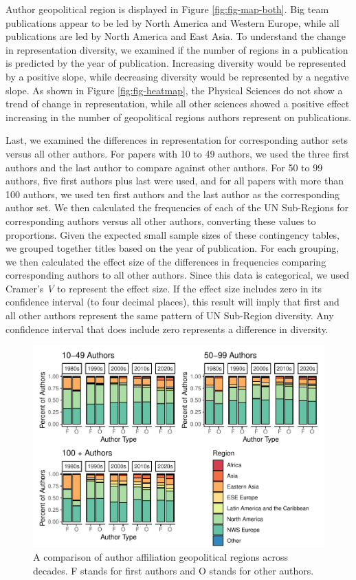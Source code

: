 \documentclass[
  man,floatsintext]{apa6}
\begin{document}
Author geopolitical region is displayed in Figure
\ref{fig:fig-map-both}. Big team publications appear to be led by North
America and Western Europe, while all publications are led by North
America and East Asia. To understand the change in representation
diversity, we examined if the number of regions in a publication is
predicted by the year of publication. Increasing diversity would be
represented by a positive slope, while decreasing diversity would be
represented by a negative slope. As shown in Figure
\ref{fig:fig-heatmap}, the Physical Sciences do not show a trend of
change in representation, while all other sciences showed a positive
effect increasing in the number of geopolitical regions authors
represent on publications.

Last, we examined the differences in representation for corresponding
author sets versus all other authors. For papers with 10 to 49 authors,
we used the three first authors and the last author to compare against
other authors. For 50 to 99 authors, five first authors plus last were
used, and for all papers with more than 100 authors, we used ten first
authors and the last author as the corresponding author set. We then
calculated the frequencies of each of the UN Sub-Regions for
corresponding authors versus all other authors, converting these values
to proportions. Given the expected small sample sizes of these
contingency tables, we grouped together titles based on the year of
publication. For each grouping, we then calculated the effect size of
the differences in frequencies comparing corresponding authors to all
other authors. Since this data is categorical, we used Cramer's \emph{V} to
represent the effect size. If the effect size includes zero in its
confidence interval (to four decimal places), this result will imply
that first and all other authors represent the same pattern of UN
Sub-Region diversity. Any confidence interval that does include zero
represents a difference in diversity.

\begin{figure}
\centering
\includegraphics{manuscript_scopus_files/figure-latex/fig-author-gpe-1.pdf}
\caption{\label{fig:fig-author-gpe}A comparison of author affiliation geopolitical regions across decades. F stands for first authors and O stands for other authors.}
\end{figure}
\end{document}
